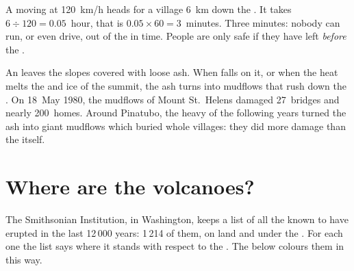 \begin{example}\label{ex:g7:volcanoes:race}
A  moving at \qty{120}{km/h} heads for a village
\qty{6}{km} down the . It takes $6 \div 120 = 0.05$~hour, that is
$0.05 \times 60 = 3$~minutes. Three minutes: nobody can run, or even drive,
out of the  in time. People are only safe if they have left
\emph{before} the .
\end{example}

\begin{remark}\label{rem:g7:volcanoes:mudflows}
An  leaves the slopes covered with loose ash. When  falls on
it, or when the heat melts the  and ice of the summit, the ash turns
into mudflows that rush down the . On 18~May 1980, the mudflows of
Mount St.~Helens damaged 27~bridges and nearly 200~homes. Around
Pinatubo, the heavy  of the following years turned the ash into
giant mudflows which buried whole villages: they did more damage than the
 itself.
\end{remark}


\section{Where are the volcanoes?}

The Smithsonian Institution, in Washington, keeps a list of all the
 known to have erupted in the last 12\,000 years: 1\,214 of them,
on land and under the . For each one the list says where it
stands with respect to the . The  below colours them in this way.

